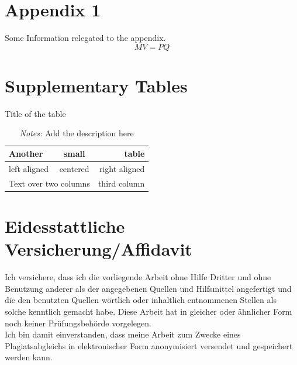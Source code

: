 \documentclass[a4paper,12pt]{scrartcl} %
\begin{document}
\clearpage
\appendix
{} %

\section{Appendix 1}

Some Information relegated to the appendix.
\begin{equation}
    MV=PQ
\end{equation}

\pagebreak

\section{Supplementary Tables}




\begin{table}[h!] %
\caption{Title of the table}
\label{tab:SuppTable1}
\centering
 \begin{tabular}{lcr}
   Another & small & table\\
\toprule
   left aligned & centered & right aligned \\
   \multicolumn{2}{c}{Text over two columns} & third column \\
\bottomrule
\end{tabular}
\caption*{\footnotesize{\emph{Notes:} Add the description here}}
\end{table}

\clearpage



\section{Eidesstattliche Versicherung/Affidavit}

Ich versichere, dass ich die vorliegende Arbeit ohne Hilfe Dritter und ohne Benutzung anderer
als der angegebenen Quellen und Hilfsmittel angefertigt und die den benutzten Quellen
wörtlich oder inhaltlich entnommenen Stellen als solche kenntlich gemacht habe. Diese Arbeit
hat in gleicher oder ähnlicher Form noch keiner Prüfungsbehörde vorgelegen.\\
Ich bin damit einverstanden, dass meine Arbeit zum Zwecke eines Plagiatsabgleichs in
elektronischer Form anonymisiert versendet und gespeichert werden kann.\\
\end{document}
